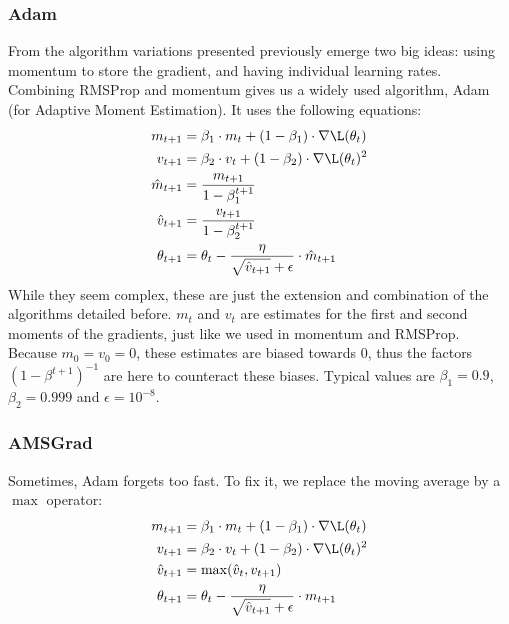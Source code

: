 \subsubsection{Adam}
From the algorithm variations presented previously emerge two big ideas: using momentum to store the gradient, and having individual learning rates. Combining RMSProp and momentum gives us a widely used algorithm, Adam (for Adaptive Moment Estimation). It uses the following equations:
\begin{equation*}
    \begin{aligned}
        m_{t+1} &= \beta_1\cdot m_t + (1-\beta_1)\cdot\nabla\L(\theta_t)\\
        v_{t+1} &= \beta_2\cdot v_t + (1-\beta_2)\cdot\nabla\L(\theta_t)^2\\
        \hat{m}_{t+1} &= \frac{m_{t+1}}{1-\beta_1^{t+1}}\\
        \hat{v}_{t+1} &= \frac{v_{t+1}}{1-\beta_2^{t+1}}\\
        \theta_{t+1} &= \theta_t - \frac{\eta}{\sqrt{\hat{v}_{t+1}}+\epsilon}\cdot\hat{m}_{t+1}
    \end{aligned}
\end{equation*}
While they seem complex, these are just the extension and combination of the algorithms detailed before. $m_t$ and $v_t$ are estimates for the first and second moments of the gradients, just like we used in momentum and RMSProp. Because $m_0=v_0=0$, these estimates are biased towards $0$, thus the factors $(1-\beta^{t+1})^{-1}$ are here to counteract these biases. Typical values are $\beta_1=0.9$, $\beta_2=0.999$ and $\epsilon=10^{-8}$.

\subsubsection{AMSGrad}
Sometimes, Adam forgets too fast. To fix it, we replace the moving average by a $\max$ operator:
\begin{equation*}
    \begin{aligned}
        m_{t+1} &= \beta_1\cdot m_t + (1-\beta_1)\cdot\nabla\L(\theta_t)\\
        v_{t+1} &= \beta_2\cdot v_t + (1-\beta_2)\cdot\nabla\L(\theta_t)^2\\
        \hat{v}_{t+1} &= \max(\hat{v}_t, v_{t+1})\\
        \theta_{t+1} &= \theta_t - \frac{\eta}{\sqrt{\hat{v}_{t+1}}+\epsilon}\cdot m_{t+1}
    \end{aligned}
\end{equation*}

